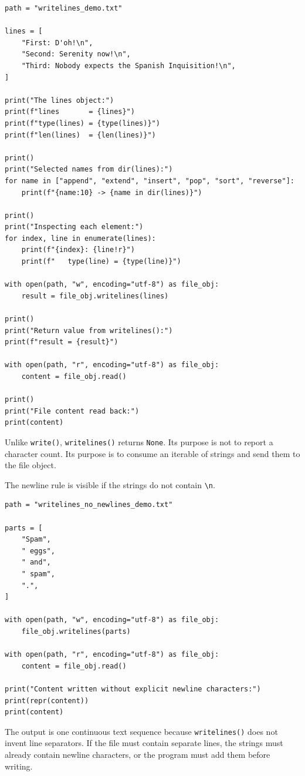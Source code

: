 \begin{verbatim}
path = "writelines_demo.txt"

lines = [
    "First: D'oh!\n",
    "Second: Serenity now!\n",
    "Third: Nobody expects the Spanish Inquisition!\n",
]

print("The lines object:")
print(f"lines       = {lines}")
print(f"type(lines) = {type(lines)}")
print(f"len(lines)  = {len(lines)}")

print()
print("Selected names from dir(lines):")
for name in ["append", "extend", "insert", "pop", "sort", "reverse"]:
    print(f"{name:10} -> {name in dir(lines)}")

print()
print("Inspecting each element:")
for index, line in enumerate(lines):
    print(f"{index}: {line!r}")
    print(f"   type(line) = {type(line)}")

with open(path, "w", encoding="utf-8") as file_obj:
    result = file_obj.writelines(lines)

print()
print("Return value from writelines():")
print(f"result = {result}")

with open(path, "r", encoding="utf-8") as file_obj:
    content = file_obj.read()

print()
print("File content read back:")
print(content)
\end{verbatim}

Unlike \texttt{write()}, \texttt{writelines()} returns \texttt{None}. Its purpose is not to report a character count. Its purpose is to consume an iterable of strings and send them to the file object.

The newline rule is visible if the strings do not contain \texttt{\textbackslash n}.

\begin{verbatim}
path = "writelines_no_newlines_demo.txt"

parts = [
    "Spam",
    " eggs",
    " and",
    " spam",
    ".",
]

with open(path, "w", encoding="utf-8") as file_obj:
    file_obj.writelines(parts)

with open(path, "r", encoding="utf-8") as file_obj:
    content = file_obj.read()

print("Content written without explicit newline characters:")
print(repr(content))
print(content)
\end{verbatim}

The output is one continuous text sequence because \texttt{writelines()} does not invent line separators. If the file must contain separate lines, the strings must already contain newline characters, or the program must add them before writing.

